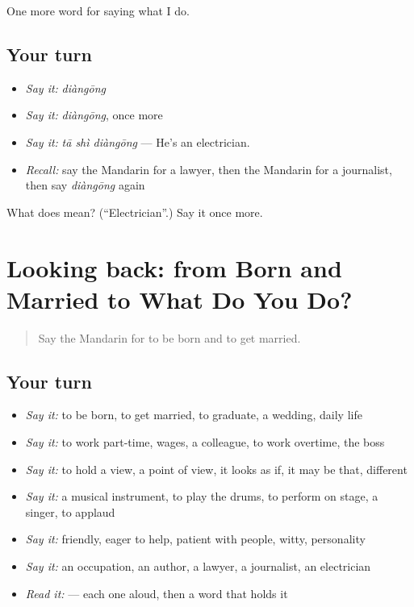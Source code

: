 \begin{grammarlens}[title={What you've built}]
One more word for saying what I do.
\end{grammarlens}

\subsection*{Your turn}
\begin{itemize}
\raggedright
  \item \emph{Say it:} \emph{diàngōng}
  \item \emph{Say it:} \emph{diàngōng}, once more
  \item \emph{Say it:} \emph{tā shì diàngōng} — He's an electrician.
  \item \emph{Recall:} say the Mandarin for a lawyer, then the Mandarin for a journalist, then say \emph{diàngōng} again
\end{itemize}

\begin{tcolorbox}[breakable,colback=teal!4,colframe=teal!35!black,title={Before you move on}]
What does  mean? (\textquotedblleft{}Electrician\textquotedblright{}.) Say it once more.
\end{tcolorbox}
\section[(dialogue)]{Looking back: from Born and Married to What Do You Do?}

\label{lesson:ZH-R259-review-254-259}



\begin{quote}
Say the Mandarin for to be born and to get married.
\end{quote}

\subsection*{Your turn}
\begin{itemize}
\raggedright
  \item \emph{Say it:} to be born, to get married, to graduate, a wedding, daily life
  \item \emph{Say it:} to work part-time, wages, a colleague, to work overtime, the boss
  \item \emph{Say it:} to hold a view, a point of view, it looks as if, it may be that, different
  \item \emph{Say it:} a musical instrument, to play the drums, to perform on stage, a singer, to applaud
  \item \emph{Say it:} friendly, eager to help, patient with people, witty, personality
  \item \emph{Say it:} an occupation, an author, a lawyer, a journalist, an electrician
  \item \emph{Read it:}   — each one aloud, then a word that holds it
\end{itemize}

